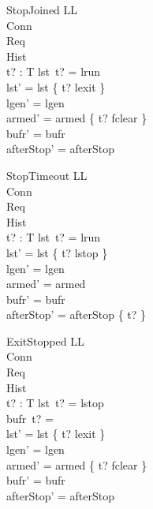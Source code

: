 \documentclass[a4paper,10pt,fleqn]{article}
\begin{document}
\begin{schema}{StopJoined}
  \Delta LL \\
  \Xi Conn \\
  \Xi Req \\
  \Xi Hist \\
  t? : T
\where
  lst~t? = lrun \\
  lst' = lst \oplus \{ t? \mapsto lexit \} \\
  lgen' = lgen \\
  armed' = armed \oplus \{ t? \mapsto fclear \} \\
  bufr' = bufr \\
  afterStop' = afterStop
\end{schema}

\begin{schema}{StopTimeout}
  \Delta LL \\
  \Xi Conn \\
  \Xi Req \\
  \Xi Hist \\
  t? : T
\where
  lst~t? = lrun \\
  lst' = lst \oplus \{ t? \mapsto lstop \} \\
  lgen' = lgen \\
  armed' = armed \\
  bufr' = bufr \\
  afterStop' = afterStop \oplus \{ t?  \}
\end{schema}

\begin{schema}{ExitStopped}
  \Delta LL \\
  \Xi Conn \\
  \Xi Req \\
  \Xi Hist \\
  t? : T
\where
  lst~t? = lstop \\
  bufr~t? = \emptyset \\
  lst' = lst \oplus \{ t? \mapsto lexit \} \\
  lgen' = lgen \\
  armed' = armed \oplus \{ t? \mapsto fclear \} \\
  bufr' = bufr \\
  afterStop' = afterStop
\end{schema}
\end{document}
